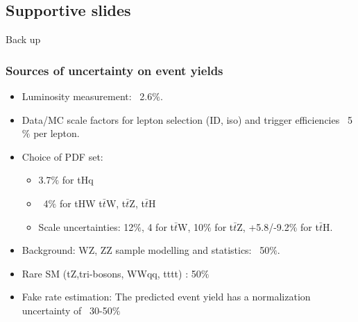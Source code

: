 \documentclass[11pt]{beamer}
\begin{document}
\begin{frame}
\section{Supportive slides}
\huge{Back up}
\end{frame}


\begin{frame}
\frametitle{Sources of uncertainty on event yields}
\begin{itemize}
	\item Luminosity measurement: ~2.6$\%$.
	\item Data/MC scale factors for lepton selection (ID, iso) and trigger efficiencies ~5$\%$ per lepton.
	\item Choice of PDF set:
	\begin{itemize}
		\item 3.7$\%$ for tHq
		\item ~4$\%$ for tHW t$\bar{t}$W, t$\bar{t}$Z, t$\bar{t}$H 
		\item Scale uncertainties: 12$\%$, 4 for t$\bar{t}$W, 10$\%$ for t$\bar{t}$Z, +5.8/-9.2$\%$ for t$\bar{t}$H.
	\end{itemize}
	\item Background: WZ, ZZ sample modelling and statistics: ~50$\%$.
	\item Rare SM (tZ,tri-bosons, WWqq, tttt) : 50$\%$
	\item Fake rate estimation:
	The predicted event yield has a normalization uncertainty of ~30-50$\%$ \cite{7}
\end{itemize}

\end{frame}






\end{document}
